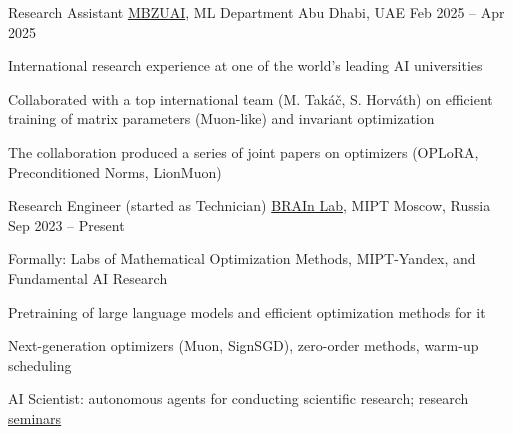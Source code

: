 
\begin{cventries}

  \cventry
    {Research Assistant} %
    {\href{https://mbzuai.ac.ae/research-department/machine-learning-department/}{MBZUAI}, ML Department} %
    {Abu Dhabi, UAE} %
    {Feb 2025 -- Apr 2025} %
    {
      \begin{cvitems}
        \item {International research experience at one of the world's leading AI universities}
        \item {Collaborated with a top international team (M. Tak{\'a}{\v{c}}, S. Horv{\'a}th) on efficient training of matrix parameters (Muon-like) and invariant optimization}
        \item {The collaboration produced a series of joint papers on optimizers (OPLoRA, Preconditioned Norms, LionMuon)}
      \end{cvitems}
    }

  \cventry
    {Research Engineer \textnormal{(started as Technician)}} %
    {\href{https://github.com/brain-lab-research}{BRAIn Lab}, MIPT} %
    {Moscow, Russia} %
    {Sep 2023 -- Present} %
    {
      \begin{cvitems}
        \item {Formally: Labs of Mathematical Optimization Methods, MIPT-Yandex, and Fundamental AI Research}
        \item {Pretraining of large language models and efficient optimization methods for it}
        \item {Next-generation optimizers (Muon, SignSGD), zero-order methods, warm-up scheduling}
        \item {AI Scientist: autonomous agents for conducting scientific research; research \href{https://rutube.ru/channel/16197436/videos/}{seminars}}
      \end{cvitems}
    }


\end{cventries}
